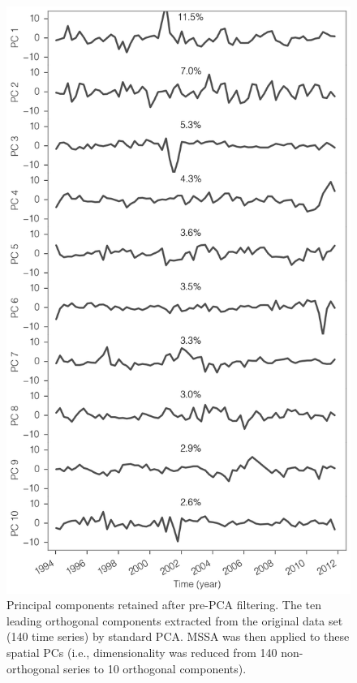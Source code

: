 \begin{figure}[!ht]
  \centering
  \includegraphics[width=.75\textwidth]{img/mssa_pre_pc_v2.png}
  \caption[Principal components of pre-PCA filtering]{
  Principal components retained after pre-PCA filtering. The ten leading orthogonal components extracted from the original data set (140 time series) by standard PCA. MSSA was then applied to these spatial PCs (i.e., dimensionality was reduced from 140 non-orthogonal series to 10 orthogonal components).
  }
  \label{c4f10}
\end{figure}


